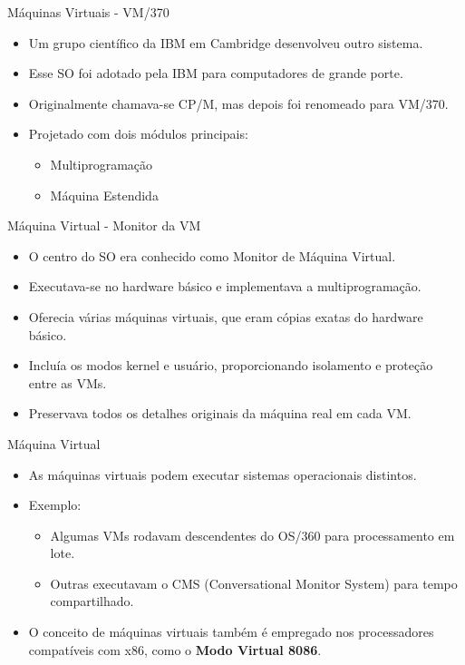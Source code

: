 \documentclass{beamer}
\begin{document}
\begin{frame}{Máquinas Virtuais - VM/370}
    \begin{itemize}
        \item Um grupo científico da IBM em Cambridge desenvolveu outro sistema.
        \item Esse SO foi adotado pela IBM para computadores de grande porte.
        \item Originalmente chamava-se CP/M, mas depois foi renomeado para VM/370.
        \item Projetado com dois módulos principais:
              \begin{itemize}
                  \item Multiprogramação
                  \item Máquina Estendida
              \end{itemize}
    \end{itemize}
\end{frame}
\begin{frame}{Máquina Virtual - Monitor da VM}
    \begin{itemize}
        \item O centro do SO era conhecido como Monitor de Máquina Virtual.
        \item Executava-se no hardware básico e implementava a multiprogramação.
        \item Oferecia várias máquinas virtuais, que eram cópias exatas do hardware básico.
        \item Incluía os modos kernel e usuário, proporcionando isolamento e proteção entre as VMs.
        \item Preservava todos os detalhes originais da máquina real em cada VM.
    \end{itemize}
\end{frame}
\begin{frame}{Máquina Virtual}
    \begin{itemize}
        \item As máquinas virtuais podem executar sistemas operacionais distintos.
        \item Exemplo:
        \begin{itemize}
            \item Algumas VMs rodavam descendentes do OS/360 para processamento em lote.
            \item Outras executavam o CMS (Conversational Monitor System) para tempo compartilhado.
        \end{itemize}
        \item O conceito de máquinas virtuais também é empregado nos processadores compatíveis com x86, como o \textbf{Modo Virtual 8086}.
    \end{itemize}
\end{frame}
\end{document}
